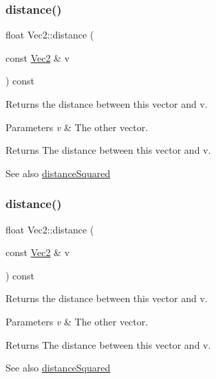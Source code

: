 \subsubsection{\texorpdfstring{distance()}{distance()}\hspace{0.1cm}{\footnotesize\ttfamily [1/2]}}
{\footnotesize\ttfamily float Vec2\+::distance (\begin{DoxyParamCaption}\item[{const \hyperlink{classVec2}{Vec2} \&}]{v }\end{DoxyParamCaption}) const}

Returns the distance between this vector and v.


\begin{DoxyParams}{Parameters}
{\em v} & The other vector.\\
\hline
\end{DoxyParams}
\begin{DoxyReturn}{Returns}
The distance between this vector and v.
\end{DoxyReturn}
\begin{DoxySeeAlso}{See also}
\hyperlink{classVec2_a5bf11958886ffb9d406a7d4e7eae4237}{distance\+Squared} 
\end{DoxySeeAlso}
\mbox{\label{classVec2_a95cf4ec6593042a5c19186828f53d146}} 
\subsubsection{\texorpdfstring{distance()}{distance()}\hspace{0.1cm}{\footnotesize\ttfamily [2/2]}}
{\footnotesize\ttfamily float Vec2\+::distance (\begin{DoxyParamCaption}\item[{const \hyperlink{classVec2}{Vec2} \&}]{v }\end{DoxyParamCaption}) const}

Returns the distance between this vector and v.


\begin{DoxyParams}{Parameters}
{\em v} & The other vector.\\
\hline
\end{DoxyParams}
\begin{DoxyReturn}{Returns}
The distance between this vector and v.
\end{DoxyReturn}
\begin{DoxySeeAlso}{See also}
\hyperlink{classVec2_a5bf11958886ffb9d406a7d4e7eae4237}{distance\+Squared} 
\end{DoxySeeAlso}
\mbox{\label{classVec2_a5bf11958886ffb9d406a7d4e7eae4237}} 
